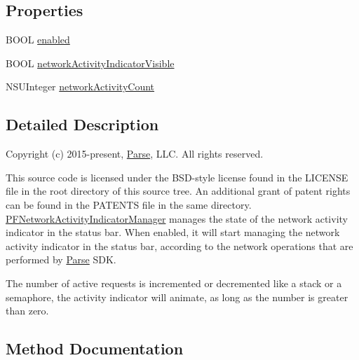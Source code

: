 \subsection*{Properties}
\begin{DoxyCompactItemize}
\item 
B\+O\+O\+L \hyperlink{interface_p_f_network_activity_indicator_manager_a8e06100fdf787d0dae5776108400d29e}{enabled}
\item 
B\+O\+O\+L \hyperlink{interface_p_f_network_activity_indicator_manager_a1e3d2adc9c714d59c15b63df0f9e8c9a}{network\+Activity\+Indicator\+Visible}
\item 
N\+S\+U\+Integer \hyperlink{interface_p_f_network_activity_indicator_manager_ab52923fab090824b0bb2609b91b1e39b}{network\+Activity\+Count}
\end{DoxyCompactItemize}


\subsection{Detailed Description}
Copyright (c) 2015-\/present, \hyperlink{interface_parse}{Parse}, L\+L\+C. All rights reserved.

This source code is licensed under the B\+S\+D-\/style license found in the L\+I\+C\+E\+N\+S\+E file in the root directory of this source tree. An additional grant of patent rights can be found in the P\+A\+T\+E\+N\+T\+S file in the same directory. {\ttfamily \hyperlink{interface_p_f_network_activity_indicator_manager}{P\+F\+Network\+Activity\+Indicator\+Manager}} manages the state of the network activity indicator in the status bar. When enabled, it will start managing the network activity indicator in the status bar, according to the network operations that are performed by \hyperlink{interface_parse}{Parse} S\+D\+K.

The number of active requests is incremented or decremented like a stack or a semaphore, the activity indicator will animate, as long as the number is greater than zero. 

\subsection{Method Documentation}
\hypertarget{interface_p_f_network_activity_indicator_manager_a76f907d87c3a142f2620b6f3467e3dd7}{}
